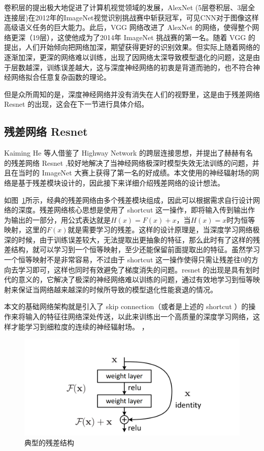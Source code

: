 卷积层的提出极大地促进了计算机视觉领域的发展，AlexNet\cite{2012ImageNet} (5层卷积层、3层全连接层)在2012年的ImageNet视觉识别挑战赛中斩获冠军，可见CNN对于图像这样高级语义任务的巨大能力。此后，VGG\cite{simonyan2014very} 网络改进了 AlexNet 的网络，使得整个网络更深（19层），这使他成为了2014年 ImageNet 挑战赛的第一名。随着 VGG 的提出，人们开始倾向把网络加深，期望获得更好的识别效果。但实际上随着网络的逐渐加深，更深的网络难以训练，出现了因网络太深导致模型退化的问题，这是由于层数越深，训练误差越大，这与深度神经网络的初衷是背道而驰的，也不符合神经网络拟合任意复杂函数的理论。

但是众所周知的是，深度神经网络并没有消失在人们的视野里，这是由于残差网络 Resnet 的出现，这会在下一节进行具体介绍。
\subsection{残差网络 Resnet}
Kaiming He 等人借鉴了 Highway Network\cite{srivastava2015highway} 的跨层连接思想，并提出了赫赫有名的残差网络 Resnet\cite{he2016deep} ,较好地解决了当神经网络极深时模型失效无法训练的问题，并且在当时的 ImageNet 大赛上获得了第一名的好成绩。本文使用的神经辐射场的网络是基于残差模块设计的，因此接下来详细介绍残差网络的设计想法。

如图~\ref{fig:resnet}所示，经典的残差网络由多个残差模块组成，因此可以根据需求自行设计网络的深度。残差网络核心思想是使用了 shortcut 这一操作，即将输入传到输出作为输出的一部分，用公式表达就是$H(x) = F(x) + x$，当$H(x) = x$时为恒等映射，这里的$F(x)$就是需要学习的残差。这样的设计原理是，当深度学习网络极深的时候，由于训练误差较大，无法提取出更抽象的特征，那么此时有了这样的残差结构，就可以学习到一个恒等映射，至少还能保留前面提取出的特征。虽然学习一个恒等映射不是非常容易，不过由于 shortcut 这一操作使得只需让残差往0的方向去学习即可，这样也同时有效避免了梯度消失的问题。resnet 的出现是具有划时代的意义的，它解决了极深的神经网络难以训练的问题，通过有效地学习到恒等映射来保证当网络越来越深的时候所导致的模型退化性能衰退的情况。

本文的基础网络架构就是引入了 skip connection（或者是上述的 shortcut ）的操作来将输入的特征往网络深处传送，以此来训练出一个高质量的深度学习网络，这样才能学习到细粒度的连续的神经辐射场。
，
\begin{figure}[t]
    \centering
    \includegraphics[width=0.7\linewidth]{figures/resnet.jpg}
    \caption{典型的残差结构}
    \label{fig:resnet}
\end{figure}

